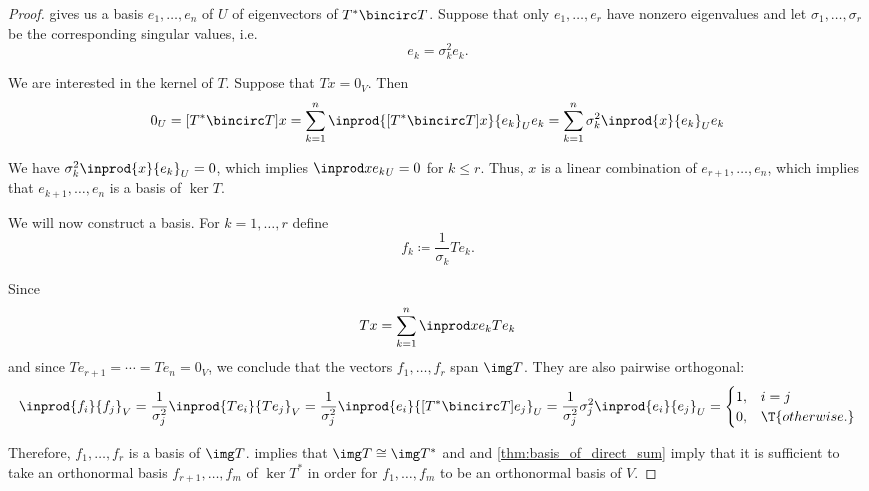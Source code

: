 \begin{proof}
    gives us a basis \( e_1, \ldots, e_n \) of \( U \) of eigenvectors of \( T^* \bincirc T \). Suppose that only \( e_1, \ldots, e_r \) have nonzero eigenvalues and let \( \sigma_1, \ldots, \sigma_r \) be the corresponding singular values, i.e.
  \begin{equation*}
    [T^* \bincirc T] e_k = \sigma_k^2 e_k.
  \end{equation*}

  We are interested in the kernel of \( T \). Suppose that \( Tx = 0_V \). Then
  \begin{equation*}
    0_U
    =
    [T^* \bincirc T] x
    =
    \sum_{k=1}^n \inprod { [T^* \bincirc T]x } { e_k }_U e_k
    =
    \sum_{k=1}^n \sigma_k^2 \inprod { x } { e_k }_U e_k
  \end{equation*}

  We have \( \sigma_k^2 \inprod { x } { e_k }_U = 0 \), which implies \( \inprod x { e_k }_U = 0 \) for \( k \leq r \). Thus, \( x \) is a linear combination of \( e_{r+1}, \ldots, e_n \), which implies that \( e_{k+1}, \ldots, e_n \) is a basis of \( \ker T \).

  We will now construct a basis. For \( k = 1, \ldots, r \) define
  \begin{equation*}
    f_k \coloneqq \frac 1 {\sigma_k} T e_k.
  \end{equation*}

  Since
  \begin{equation*}
    T x = \sum_{k=1}^n \inprod x { e_k } T e_k
  \end{equation*}
  and since \( T e_{r+1} = \cdots = T e_n = 0_V \), we conclude that the vectors \( f_1, \ldots, f_r \) span \( \img T \). They are also pairwise orthogonal:
  \begin{equation*}
    \inprod { f_i } { f_j }_V
    =
    \frac 1 {\sigma_j^2} \inprod { T e_i } { T e_j }_V
    =
    \frac 1 {\sigma_j^2} \inprod { e_i } { [T^* \bincirc T] e_j }_U
    =
    \frac 1 {\sigma_j^2} {\sigma_j^2} \inprod { e_i } { e_j }_U
    =
    \begin{cases}
      1, &i = j \\
      0, &\T{otherwise.}
    \end{cases}
  \end{equation*}

  Therefore, \( f_1, \ldots, f_r \) is a basis of \( \img T \).  implies that \( \img T \cong \img T^* \) and  and \cref{thm:basis_of_direct_sum} imply that it is sufficient to take an orthonormal basis \( f_{r+1}, \ldots, f_m \) of \( \ker T^* \) in order for \( f_1, \ldots, f_m \) to be an orthonormal basis of \( V \).


\end{proof}
